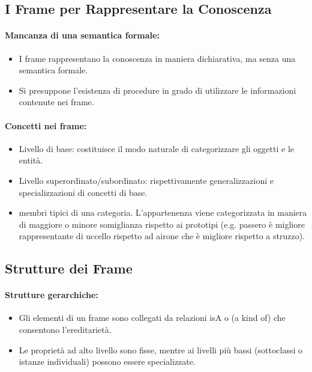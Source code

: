 
\subsection{I Frame per Rappresentare la Conoscenza}

\paragraph{Mancanza di una semantica formale:}

\begin{itemize}
  \item I frame rappresentano la conoscenza in maniera dichiarativa, ma senza una semantica formale. 
  \item Si presuppone l'esistenza di procedure in grado di utilizzare le informazioni contenute nei frame. 
\end{itemize}

\paragraph{Concetti nei frame:}

\begin{itemize}
  \item Livello di base: costituisce il modo naturale di categorizzare gli oggetti e le entità. 
  \item Livello superordinato/subordinato: rispettivamente generalizzazioni e specializzazioni di concetti di base.
  \item {} membri tipici di una categoria. L'appartenenza viene categorizzata in maniera di maggiore o minore somiglianza rispetto ai prototipi (e.g. passero è migliore rappresentante di uccello rispetto ad airone che è migliore rispetto a struzzo).
\end{itemize}

\subsection{Strutture dei Frame}

\paragraph{Strutture gerarchiche:}
\begin{itemize}
  \item Gli elementi di un frame sono collegati da relazioni isA o  (a kind of) che consentono l'ereditarietà. 
  \item Le proprietà ad alto livello sono fisse, mentre ai livelli più bassi (sottoclassi o istanze individuali) possono essere specializzate.
\end{itemize}

